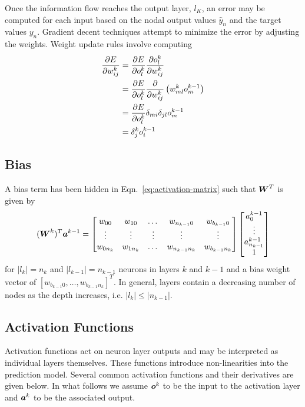 \documentclass[12pt,notitlepage]{article}
\begin{document}
Once the information flow reaches the output layer, $l_{K}$, an error
may be computed for each input based on the nodal output values
$\hat{y}_{n}$ and the target values $y_{n}$.  Gradient decent
techniques attempt to minimize the error by adjusting the weights.
Weight update rules involve computing
\begin{equation}
  \label{eq:error-grad}
  \begin{split}
    \frac{\partial E}{\partial w^{k}_{ij}} &=
    \frac{\partial E}{\partial o_{l}^{k}}\frac{\partial o_{l}^{k}}{\partial w_{ij}^{k}}\\
    &= \frac{\partial E}{\partial o_{l}^{k}} \frac{\partial }{\partial w_{ij}^{k}}\left( w_{ml}^{k}o^{k-1}_{m} \right)\\
    &= \frac{\partial E}{\partial o_{l}^{k}}\delta_{mi}\delta_{jl}o_{m}^{k-1}\\
    &= \delta_{j}^{k}o_{i}^{k-1}
  \end{split}
\end{equation}

\subsection{Bias}
\label{sec:bias}
A bias term has been hidden in Eqn.~\ref{eq:activation-matrix} such
that $\boldsymbol{W}^{T}$ is given by
\begin{equation}
  \label{eq:wmat-explicit}
  (\boldsymbol{W}^{k})^{T}\boldsymbol{a}^{k-1} =
  \begin{bmatrix}
    w_{00} & w_{10} & \dots & w_{n_{k-1}0} & w_{b_{k-1}0} \\
    \vdots & \vdots & \vdots & \vdots & \vdots \\
    w_{0n_{k}} & w_{1n_{k}} & \dots & w_{n_{k-1}n_{k}} & w_{b_{k-1}n_{k}}
  \end{bmatrix}
  \begin{bmatrix}
    a_{0}^{k-1}\\
    \vdots\\
    a_{n_{k-1}}^{k-1}\\
    1
  \end{bmatrix}
\end{equation}
for $|l_{k}|=n_{k}$ and $|l_{k-1}|=n_{k-1}$ neurons in layers $k$ and $k-1$ and a bias
weight vector of $[w_{b_{k-1}0},\dots,w_{b_{k-1}n_{k}}]^{T}$.  In
general, layers contain a decreasing number of nodes as the depth
increases, i.e. $|l_{k}| \le |n_{k-1}|$.

\subsection{Activation Functions}
\label{sec:activation-fun}
Activation functions act on neuron layer outputs and may be interpreted as
individual layers themselves.  These functions introduce
non-linearities into the prediction model.  Several common activation
functions and their derivatives are given below.  In what follows we
assume $\boldsymbol{o}^{k}$ to be the input to the activation layer and
$\boldsymbol{a}^{k}$ to be the associated output.
\end{document}
